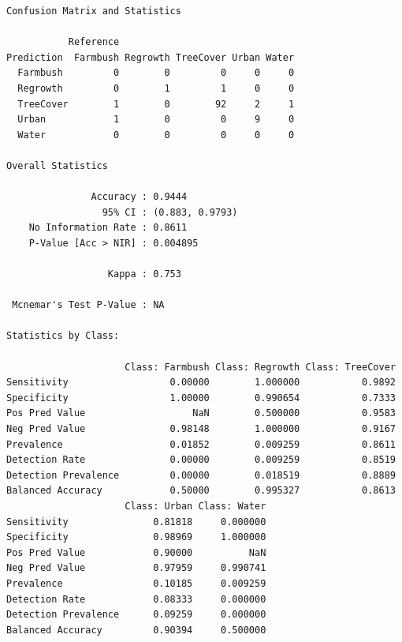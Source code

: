 \documentclass[
]{article}
\newenvironment{Shaded}{\begin{snugshade}}{\end{snugshade}}
\newcommand{\CommentTok}[1]{\textcolor[rgb]{0.56,0.35,0.01}{\textit{#1}}}
\newcommand{\FunctionTok}[1]{\textcolor[rgb]{0.13,0.29,0.53}{\textbf{#1}}}
\newcommand{\NormalTok}[1]{#1}
\newcommand{\SpecialCharTok}[1]{\textcolor[rgb]{0.81,0.36,0.00}{\textbf{#1}}}
\begin{document}
\begin{Shaded}
\end{Shaded}

\begin{verbatim}
Confusion Matrix and Statistics

           Reference
Prediction  Farmbush Regrowth TreeCover Urban Water
  Farmbush         0        0         0     0     0
  Regrowth         0        1         1     0     0
  TreeCover        1        0        92     2     1
  Urban            1        0         0     9     0
  Water            0        0         0     0     0

Overall Statistics
                                         
               Accuracy : 0.9444         
                 95% CI : (0.883, 0.9793)
    No Information Rate : 0.8611         
    P-Value [Acc > NIR] : 0.004895       
                                         
                  Kappa : 0.753          
                                         
 Mcnemar's Test P-Value : NA             

Statistics by Class:

                     Class: Farmbush Class: Regrowth Class: TreeCover
Sensitivity                  0.00000        1.000000           0.9892
Specificity                  1.00000        0.990654           0.7333
Pos Pred Value                   NaN        0.500000           0.9583
Neg Pred Value               0.98148        1.000000           0.9167
Prevalence                   0.01852        0.009259           0.8611
Detection Rate               0.00000        0.009259           0.8519
Detection Prevalence         0.00000        0.018519           0.8889
Balanced Accuracy            0.50000        0.995327           0.8613
                     Class: Urban Class: Water
Sensitivity               0.81818     0.000000
Specificity               0.98969     1.000000
Pos Pred Value            0.90000          NaN
Neg Pred Value            0.97959     0.990741
Prevalence                0.10185     0.009259
Detection Rate            0.08333     0.000000
Detection Prevalence      0.09259     0.000000
Balanced Accuracy         0.90394     0.500000
\end{verbatim}
\end{document}
